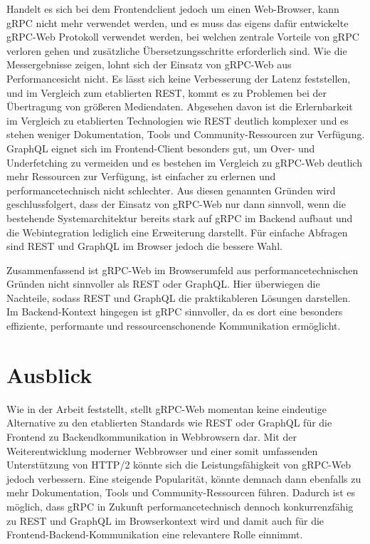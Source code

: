 Handelt es sich bei dem Frontendclient jedoch um einen Web-Browser, kann gRPC nicht mehr verwendet werden, und es muss das eigens dafür entwickelte gRPC-Web Protokoll verwendet werden, bei welchen zentrale Vorteile von gRPC verloren gehen und zusätzliche Übersetzungsschritte erforderlich sind. Wie die Messergebnisse zeigen, lohnt sich der Einsatz von gRPC-Web aus Performancesicht nicht. Es lässt sich keine Verbesserung der Latenz feststellen, und im Vergleich zum etablierten REST, kommt es zu Problemen bei der Übertragung von größeren Mediendaten. Abgesehen davon ist die Erlernbarkeit im Vergleich zu etablierten Technologien wie REST deutlich komplexer und es stehen weniger Dokumentation, Tools und Community-Ressourcen zur Verfügung. GraphQL eignet sich im Frontend-Client besonders gut, um Over- und Underfetching zu vermeiden und es bestehen im Vergleich zu gRPC-Web deutlich mehr Ressourcen zur Verfügung, ist einfacher zu erlernen und performancetechnisch nicht schlechter. 
Aus diesen genannten Gründen wird geschlussfolgert, dass der Einsatz von gRPC-Web nur dann sinnvoll, wenn die bestehende Systemarchitektur bereits stark auf gRPC im Backend aufbaut und die Webintegration lediglich eine Erweiterung darstellt. Für einfache Abfragen sind REST und GraphQL im Browser jedoch die bessere Wahl.


Zusammenfassend ist gRPC-Web im Browserumfeld aus performancetechnischen Gründen nicht sinnvoller als REST oder GraphQL. Hier überwiegen die Nachteile, sodass REST und GraphQL die praktikableren Lösungen darstellen. Im Backend-Kontext hingegen ist gRPC sinnvoller, da es dort eine besonders effiziente, performante und ressourcenschonende Kommunikation ermöglicht.


\section{Ausblick}
Wie in der Arbeit feststellt, stellt gRPC-Web momentan keine eindeutige Alternative zu den etablierten Standards wie REST oder GraphQL für die Frontend zu Backendkommunikation in Webbrowsern dar. Mit der Weiterentwicklung moderner Webbrowser und einer somit umfassenden Unterstützung von HTTP/2 könnte sich die Leistungsfähigkeit von gRPC-Web jedoch verbessern. Eine steigende Popularität, könnte demnach dann ebenfalls zu mehr Dokumentation, Tools und Community-Ressourcen führen. Dadurch ist es möglich, dass gRPC in Zukunft performancetechnisch dennoch konkurrenzfähig zu REST und GraphQL im Browserkontext wird und damit auch für die Frontend-Backend-Kommunikation eine relevantere Rolle einnimmt.
\chapterend
